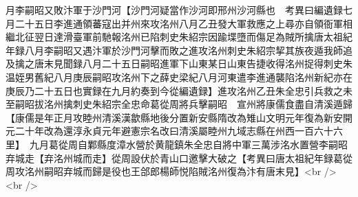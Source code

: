 月李嗣昭又敗汴軍于沙門河【沙門河疑當作沙河即邢州沙河縣也　考異曰編遺録七月二十五日李進通領蕃寇出并州來攻洺州八月乙丑發大軍救應之上尋亦自領衙軍相繼北征翌日達滑臺軍前馳報洺州已陷刺史朱紹宗因踰堞墮而傷足為賊所擒唐太祖紀年録八月李嗣昭又遇汴軍於沙門河擊而敗之進攻洺州刺史朱紹宗挈其族夜遁我師追及擒之唐末見聞録八月二十五日嗣昭進軍下山東某日山東告捷收得洺州捉得刺史朱温姪男舊紀八月庚辰嗣昭攻洺州下之薛史梁紀八月河東遣李進通襲陷洺州新紀亦在庚辰乃二十五日也實録在九月約奏到今從編遺録】進攻洺州乙丑朱全忠引兵救之未至嗣昭拔洺州擒刺史朱紹宗全忠命葛從周將兵擊嗣昭　宣州將康儒食盡自清溪遁歸【康儒是年正月攻睦州清溪漢歙縣地後分置新安縣隋改為雉山文明元年復為新安開元二十年改為還淳永貞元年避憲宗名改曰清溪屬睦州九域志縣在州西一百六十六里】　九月葛從周自鄴縣度漳水營於黄龍鎮朱全忠自將中軍三萬涉洺水置營李嗣昭弃城走【弃洺州城而走】從周設伏於青山口邀擊大破之【考異曰唐太祖紀年録葛從周攻洺州嗣昭弃城而歸是役也王郃郎楊師悦陷賊洺州復為汴有唐末見】<br />
<br />

